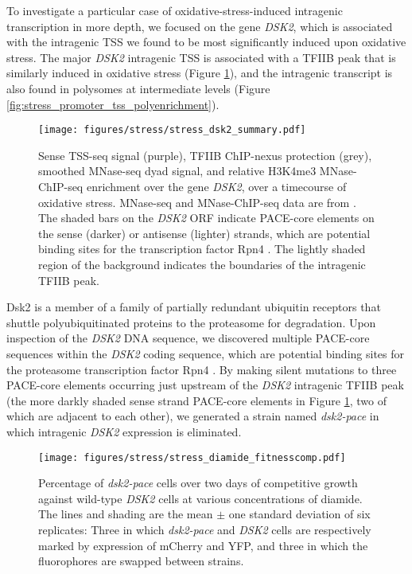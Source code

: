 To investigate a particular case of oxidative-stress-induced intragenic transcription in more depth, we focused on the gene \textit{DSK2}, which is associated with the intragenic TSS we found to be most significantly induced upon oxidative stress.
The major \textit{DSK2} intragenic TSS is associated with a TFIIB peak that is similarly induced in oxidative stress (Figure \ref{fig:stress_dsk2_summary}), and the intragenic transcript is also found in polysomes at intermediate levels (Figure \ref{fig:stress_promoter_tss_polyenrichment}).
\begin{figure}[h]
    \texttt{[image: figures/stress/stress\_dsk2\_summary.pdf]}
    \caption[Sense TSS-seq signal, TFIIB ChIP-nexus protection, and MNase-ChIP-seq data at the \textit{DSK2} gene, over an oxidative stress timecourse.]{Sense TSS-seq signal (purple), TFIIB ChIP-nexus protection (grey), smoothed MNase-seq dyad signal, and relative H3K4me3 MNase-ChIP-seq enrichment over the gene \textit{DSK2}, over a timecourse of oxidative stress. MNase-seq and MNase-ChIP-seq data are from \citet{weiner2015}. The shaded bars on the \textit{DSK2} ORF indicate PACE-core elements on the sense (darker) or antisense (lighter) strands, which are potential binding sites for the transcription factor Rpn4 \citep{shirozu2015}. The lightly shaded region of the background indicates the boundaries of the intragenic TFIIB peak.}
    \label{fig:stress_dsk2_summary}
\end{figure}

Dsk2 is a member of a family of partially redundant ubiquitin receptors that shuttle polyubiquitinated proteins to the proteasome for degradation.
Upon inspection of the \textit{DSK2} DNA sequence, we discovered multiple PACE-core sequences within the \textit{DSK2} coding sequence, which are potential binding sites for the proteasome transcription factor Rpn4 \citep{shirozu2015}.
By making silent mutations to three PACE-core elements occurring just upstream of the \textit{DSK2} intragenic TFIIB peak (the more darkly shaded sense strand PACE-core elements in Figure \ref{fig:stress_dsk2_summary}, two of which are adjacent to each other), we generated a strain named \textit{dsk2-pace} in which intragenic \textit{DSK2} expression is eliminated.

\begin{figure}
    \texttt{[image: figures/stress/stress\_diamide\_fitnesscomp.pdf]}
    \caption[Percentage of \textit{dsk2-pace} cells over two days of competitive growth against wild-type \textit{DSK2} cells at various concentrations of diamide.]{Percentage of \textit{dsk2-pace} cells over two days of competitive growth against wild-type \textit{DSK2} cells at various concentrations of diamide. The lines and shading are the mean $\pm$ one standard deviation of six replicates: Three in which \textit{dsk2-pace} and \textit{DSK2} cells are respectively marked by expression of mCherry and YFP, and three in which the fluorophores are swapped between strains.}
    \label{fig:stress_diamide_fitnesscomp}
\end{figure}

